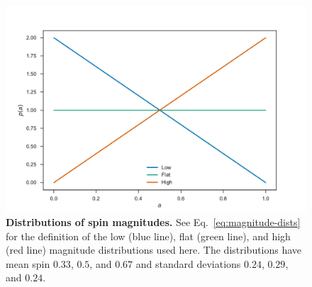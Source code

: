 \documentclass{nature-arxiv}
\begin{document}
\begin{methods}
\begin{thebibliography}{10}
\end{thebibliography}

\newpage

\begin{table}
\begin{centering}
\caption[]{\textbf{Significance $\sigma_{I/A}$ of the odds ratio between the isotropic and aligned models.} The odds ratio is computed using just GW150914 and GW151226, all 3 O1 events, and all 4 currently observed events (including GW170104). The number in bold is the result we quote in the main text.}
\label{tab:accumulation}
\end{centering}
\end{table}

\newpage

\begin{figure}
  \includegraphics[width=\columnwidth]{../plots/pa}
  \caption{\textbf{Distributions of spin magnitudes.}  See Eq.\
    \eqref{eq:magnitude-dists} for the definition of the low (blue
    line), flat (green line), and high (red line) magnitude
    distributions used here.  The distributions have mean spin $0.33$,
    $0.5$, and $0.67$ and standard deviations $0.24$, $0.29$, and
    $0.24$.}
  \label{fig:pa}
\end{figure}


\end{methods}
\end{document}
